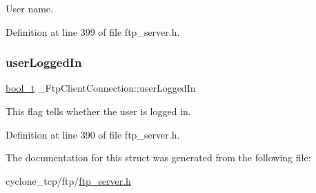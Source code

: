User name. 



Definition at line 399 of file ftp\+\_\+server.\+h.

\mbox{\label{struct__FtpClientConnection_a640338022687b9e562da44ad101cf82f}} 
\subsubsection{\texorpdfstring{user\+Logged\+In}{userLoggedIn}}
{\footnotesize\ttfamily \hyperlink{compiler__port_8h_a812d16e5494522586b3784e55d479912}{bool\+\_\+t} \+\_\+\+Ftp\+Client\+Connection\+::user\+Logged\+In}



This flag tells whether the user is logged in. 



Definition at line 390 of file ftp\+\_\+server.\+h.



The documentation for this struct was generated from the following file\+:\begin{DoxyCompactItemize}
\item 
cyclone\+\_\+tcp/ftp/\hyperlink{ftp__server_8h}{ftp\+\_\+server.\+h}\end{DoxyCompactItemize}
